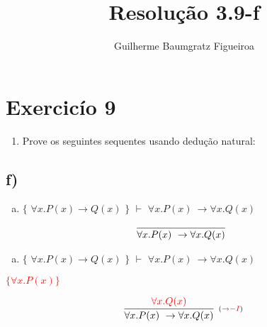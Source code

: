 \documentclass[aspectratio=43]{beamer}
\title[\sc{Resolu\c c\~ao}]{Resolu\c c\~ao 3.9-f}
\author[Guilherme Baumgratz Figueiroa]{Guilherme Baumgratz Figueiroa}
\institute[UFOP]{Universidade Federal de Ouro Preto} %
\date{}
\begin{document}
	
	\begin{frame}
		\titlepage
	\end{frame}
	
	\section{Exercic\'io 9}
	
	\begin{frame}%
    
    	\begin{enumerate}[1.]
			\item Prove os seguintes sequentes usando dedu\c c\~ao natural: \\
		\end{enumerate}
				
	\end{frame}
    \subsection{f)}
    
    \begin{frame}[fragile]
    
    	\begin{enumerate}[f)]
			\item $\{$ $\forall x.P(x)\to Q(x) $ $\}$ $\vdash$ $ \forall x.P(x)\ \to \forall x.Q(x) $ \\
		\end{enumerate}
        
        \vspace{65pt}
        
        \[
        \begin{array}{c}
		
        	\infer[_{}]
            	{\forall x.P(x)\ \to \forall x.Q(x)}
            	{}
        
		\end{array}
        \]
        
	\end{frame}
    
    \begin{frame}[fragile]
    
    	\begin{enumerate}[f)]
			\item $\{$ $\forall x.P(x)\to Q(x) $ $\}$ $\vdash$ $ \forall x.P(x)\ \to \forall x.Q(x) $ \\
		\end{enumerate}
        \textcolor{red}{ $\{\forall x.P(x)\}$}
        \vspace{60pt}
        
        \[
        \begin{array}{c}
		
        	\infer[_{(\textcolor{red}{\to -I})}]
            	{\forall x.P(x)\ \to \forall x.Q(x)}
            	{\textcolor{red}{\forall x.Q(x)}}
        
		\end{array}
        \]
        
	\end{frame}
    
\end{document}
